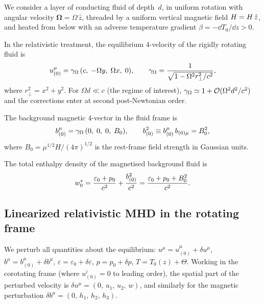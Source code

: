 We consider a layer of conducting fluid of depth~$d$, in uniform
rotation with angular velocity $\boldsymbol{\Omega} = \Omega\,\hat{z}$,
threaded by a uniform vertical magnetic field $H = H\,\hat{z}$,
and heated from below with an adverse temperature gradient
$\beta = -\dd T_0/\dd z > 0$.

In the relativistic treatment, the equilibrium 4-velocity of the
rigidly rotating fluid is
\begin{equation}
  u^{\mu}_{(0)} = \gamma_\Omega\,(c,\;-\Omega y,\;\Omega x,\;0),
  \qquad
  \gamma_\Omega = \frac{1}{\sqrt{1 - \Omega^{2}r_{\perp}^{2}/c^{2}}},
  \label{eq:rel51-u0}
\end{equation}
where $r_\perp^2 = x^2+y^2$.  For $\Omega d \ll c$ (the regime of
interest), $\gamma_\Omega \simeq 1 + \mathcal{O}(\Omega^{2}d^{2}/c^{2})$
and the corrections enter at second post-Newtonian order.

The background magnetic 4-vector in the fluid frame is
\begin{equation}
  b^{\mu}_{(0)} = \gamma_\Omega\,(0,\;0,\;0,\;B_0),
  \qquad
  b^{2}_{(0)} \equiv b^{\mu}_{(0)}\,b_{(0)\mu} = B_0^{2},
  \label{eq:rel51-b0}
\end{equation}
where $B_0 = \mu^{1/2} H/(4\pi)^{1/2}$ is the rest-frame field
strength in Gaussian units.

The total enthalpy density of the magnetised background fluid is
\begin{equation}
  w^{*}_{0}
  = \frac{\varepsilon_{0} + p_{0}}{c^{2}} + \frac{b^{2}_{(0)}}{c^{2}}
  = \frac{\varepsilon_{0} + p_{0} + B_0^{2}}{c^{2}}.
  \label{eq:rel51-wstar}
\end{equation}

\subsection{Linearized relativistic MHD in the rotating frame}
\label{sec:lin-rmhd-rot}

We perturb all quantities about the equilibrium:
$u^{\mu} = u^{\mu}_{(0)} + \delta u^{\mu}$,
$b^{\mu} = b^{\mu}_{(0)} + \delta b^{\mu}$,
$\varepsilon = \varepsilon_{0} + \delta\varepsilon$,
$p = p_{0} + \delta p$, $T = T_0(z) + \Theta$.
Working in the corotating frame (where $u^{i}_{(0)}=0$ to leading
order), the spatial part of the perturbed velocity is
$\delta u^{\mu} = (0,\, u_1,\, u_2,\, w)$, and similarly for the
magnetic perturbation
$\delta b^{\mu} = (0,\, h_1,\, h_2,\, h_3)$.

